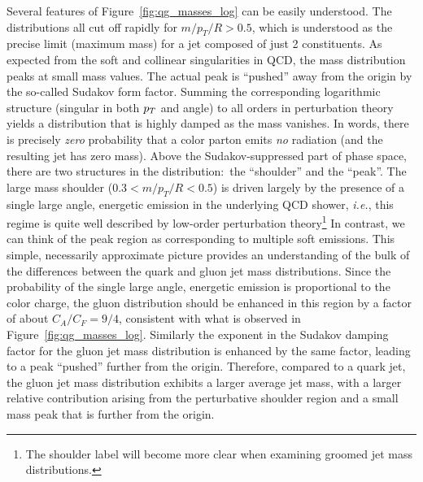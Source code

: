 Several features of Figure~\ref{fig:qg_masses_log} can be easily understood.  The distributions all cut off rapidly for $m/p_T/R > 0.5$, which is understood as
the precise limit (maximum mass) for a jet composed of just 2 constituents.  As expected from the soft and collinear singularities in QCD, the mass distribution peaks 
at small mass values.  The actual peak is ``pushed'' away from the origin by the so-called Sudakov form factor.  Summing the corresponding logarithmic structure 
(singular in both $p_T$ and angle) to all orders in perturbation theory yields a distribution that is highly damped  as the mass vanishes.  In words, there is precisely 
\textit{zero} probability that a color parton emits \textit{no} radiation (and the resulting jet has zero mass). Above the Sudakov-suppressed part of phase space, there are two 
structures in the distribution:~the ``shoulder'' and the ``peak''.
 The large mass shoulder ($0.3 < m/p_T/R < 0.5$) is driven largely by the presence of a single large angle, energetic
emission in the underlying QCD shower, \textit{i.e.}, this regime is quite well described by low-order perturbation theory\footnote{The shoulder label will become more clear when examining groomed jet mass distributions.} 
In contrast, we can think of the peak region as corresponding to multiple soft emissions.  This simple, necessarily approximate picture 
provides an understanding of the bulk of the
differences between the quark and gluon jet mass distributions.  Since the probability of the single large angle, energetic emission is proportional to the color charge,
the gluon distribution should be enhanced in this region by a factor of about $C_A/C_F = 9/4$, consistent with what is observed in Figure~\ref{fig:qg_masses_log}.
Similarly the exponent in the Sudakov damping factor for the gluon jet mass distribution  is enhanced by the same factor, 
leading to a peak ``pushed'' further from the origin.  Therefore, compared to a quark jet, the gluon jet mass 
distribution exhibits a larger average jet mass, with a larger relative contribution arising from the perturbative shoulder region and a small mass peak that is further
from the origin.  

